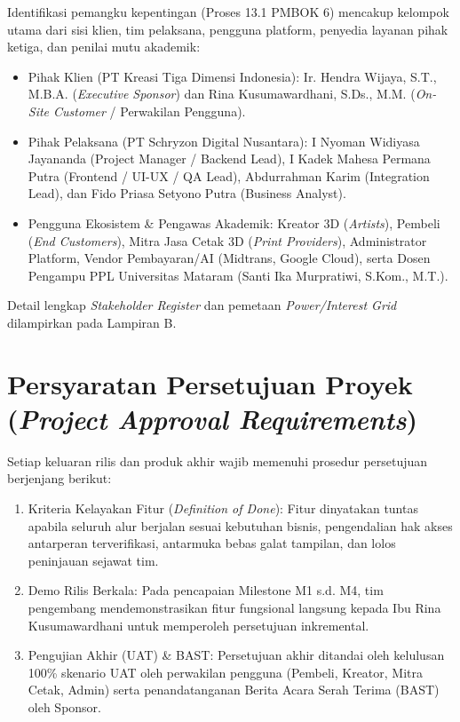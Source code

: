 \documentclass[11pt,a4paper]{article}
\begin{document}
Identifikasi pemangku kepentingan (Proses 13.1 PMBOK 6) mencakup kelompok utama dari sisi klien, tim pelaksana, pengguna platform, penyedia layanan pihak ketiga, dan penilai mutu akademik:
\begin{itemize}[leftmargin=1.5em, itemsep=1.5pt, topsep=2pt]
    \item Pihak Klien (PT Kreasi Tiga Dimensi Indonesia): Ir. Hendra Wijaya, S.T., M.B.A. (\textit{Executive Sponsor}) dan Rina Kusumawardhani, S.Ds., M.M. (\textit{On-Site Customer} / Perwakilan Pengguna).
    \item Pihak Pelaksana (PT Schryzon Digital Nusantara): I Nyoman Widiyasa Jayananda (Project Manager / Backend Lead), I Kadek Mahesa Permana Putra (Frontend / UI-UX / QA Lead), Abdurrahman Karim (Integration Lead), dan Fido Priasa Setyono Putra (Business Analyst).
    \item Pengguna Ekosistem \& Pengawas Akademik: Kreator 3D (\textit{Artists}), Pembeli (\textit{End Customers}), Mitra Jasa Cetak 3D (\textit{Print Providers}), Administrator Platform, Vendor Pembayaran/AI (Midtrans, Google Cloud), serta Dosen Pengampu PPL Universitas Mataram (Santi Ika Murpratiwi, S.Kom., M.T.).
\end{itemize}
Detail lengkap \textit{Stakeholder Register} dan pemetaan \textit{Power/Interest Grid} dilampirkan pada Lampiran B.

\vspace{-4pt}
\section{Persyaratan Persetujuan Proyek (\textit{Project Approval Requirements})}

Setiap keluaran rilis dan produk akhir wajib memenuhi prosedur persetujuan berjenjang berikut:
\begin{enumerate}[leftmargin=1.5em, itemsep=1.5pt, topsep=2pt]
    \item Kriteria Kelayakan Fitur (\textit{Definition of Done}): Fitur dinyatakan tuntas apabila seluruh alur berjalan sesuai kebutuhan bisnis, pengendalian hak akses antarperan terverifikasi, antarmuka bebas galat tampilan, dan lolos peninjauan sejawat tim.
    \item Demo Rilis Berkala: Pada pencapaian Milestone M1 s.d. M4, tim pengembang mendemonstrasikan fitur fungsional langsung kepada Ibu Rina Kusumawardhani untuk memperoleh persetujuan inkremental.
    \item Pengujian Akhir (UAT) \& BAST: Persetujuan akhir ditandai oleh kelulusan 100\% skenario UAT oleh perwakilan pengguna (Pembeli, Kreator, Mitra Cetak, Admin) serta penandatanganan Berita Acara Serah Terima (BAST) oleh Sponsor.
\end{enumerate}
\end{document}
